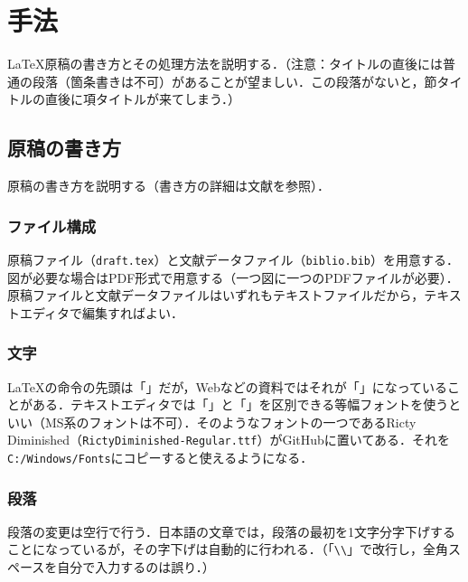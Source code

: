 \documentclass[uplatex,twocolumn,dvipdfmx]{jsarticle}
\begin{document}
\section{手法}

\LaTeX 原稿の書き方とその処理方法を説明する．（注意：タイトルの直後には普通の段落（箇条書きは不可）があることが望ましい．この段落がないと，節タイトルの直後に項タイトルが来てしまう．）

\subsection{原稿の書き方}

原稿の書き方を説明する（書き方の詳細は文献\cite{okumura2017}を参照）．

\subsubsection{ファイル構成}

原稿ファイル（\verb|draft.tex|）と文献データファイル（\verb|biblio.bib|）を用意する．図が必要な場合はPDF形式で用意する（一つ図に一つのPDFファイルが必要）．原稿ファイルと文献データファイルはいずれもテキストファイルだから，テキストエディタで編集すればよい．

\subsubsection{文字}

\LaTeX の命令の先頭は「\hspace{-0.5zw}」だが，Webなどの資料ではそれが「\hspace{-0.5zw}」になっていることがある．テキストエディタでは「\hspace{-0.5zw}」と「\hspace{-0.5zw}」を区別できる等幅フォントを使うといい（MS系のフォントは不可）．そのようなフォントの一つであるRicty Diminished（\verb|RictyDiminished-Regular.ttf|）がGitHubに置いてある．それを\verb|C:/Windows/Fonts|にコピーすると使えるようになる．

\subsubsection{段落}

段落の変更は空行で行う．日本語の文章では，段落の最初を1文字分字下げすることになっているが，その字下げは自動的に行われる．（「\verb|\\|」で改行し，全角スペースを自分で入力するのは誤り．）
\end{document}
